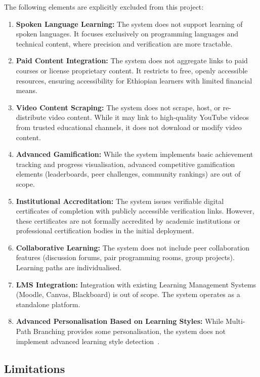 The following elements are explicitly excluded from this project:
\begin{enumerate}
    \item \textbf{Spoken Language Learning:} The system does not support learning of spoken languages. It focuses exclusively on programming languages and technical content, where precision and verification are more tractable.
    \item \textbf{Paid Content Integration:} The system does not aggregate links to paid courses or license proprietary content. It restricts to free, openly accessible resources, ensuring accessibility for Ethiopian learners with limited financial means.
    \item \textbf{Video Content Scraping:} The system does not scrape, host, or re-distribute video content. While it may link to high-quality YouTube videos from trusted educational channels, it does not download or modify video content.
    \item \textbf{Advanced Gamification:} While the system implements basic achievement tracking and progress visualisation, advanced competitive gamification elements (leaderboards, peer challenges, community rankings) are out of scope.
    \item \textbf{Institutional Accreditation:} The system issues verifiable digital certificates of completion with publicly accessible verification links. However, these certificates are not formally accredited by academic institutions or professional certification bodies in the initial deployment.
    \item \textbf{Collaborative Learning:} The system does not include peer collaboration features (discussion forums, pair programming rooms, group projects). Learning paths are individualised.
    \item \textbf{LMS Integration:} Integration with existing Learning Management Systems (Moodle, Canvas, Blackboard) is out of scope. The system operates as a standalone platform.
    \item \textbf{Advanced Personalisation Based on Learning Styles:} While Multi-Path Branching provides some personalisation, the system does not implement advanced learning style detection~\cite{pashler2008}.
\end{enumerate}

\subsection{Limitations}


